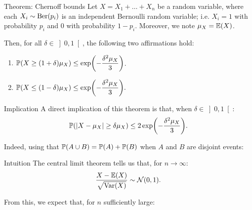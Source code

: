 \documentclass[a4paper]{article}
\begin{document}
\begin{parag}{Theorem: Chernoff bounds}
    Let $X = X_1 + \ldots + X_n$ be a random variable, where each $X_i \followsdistr \text{Ber}\left(p_i\right)$ is an independent Bernoulli random variable; i.e. $X_i = 1$ with probability $p_i$ and $0$ with probability $1 - p_i$. Moreover, we note $\mu_X = \exval\left(X\right)$.

    Then, for all $\delta \in \left]0, 1\right[ $, the following two affirmations hold:
    \begin{enumerate}
        \item $\displaystyle \prob\left(X \geq \left(1 + \delta\right)\mu_X\right) \leq \exp\left(-\frac{\delta^2 \mu_X}{3}\right)$.
        \item $\displaystyle \prob\left(X \leq \left(1 - \delta\right)\mu_X\right) \leq \exp\left(-\frac{\delta^2 \mu_X}{3}\right).$
    \end{enumerate}

    \begin{subparag}{Implication}
        A direct implication of this theorem is that, when $\delta \in \left]0, 1\right[ $: 
        \[\prob\left(\left|X - \mu_X\right| \geq \delta \mu_X\right) \leq 2 \exp\left(-\frac{\delta^2 \mu_X}{3}\right).\]
        
        Indeed, using that $\prob\left(A \cup B\right) = \prob\left(A\right)+ \prob\left(B\right)$ when $A$ and $B$ are disjoint events:
    \end{subparag}
    
    \begin{subparag}{Intuition}
        The central limit theorem tells us that, for $n \to \infty$: 
        \[\frac{X - \exval\left(X\right)}{\sqrt{\Var\left(X\right)}} \followsdistr \mathcal{N}\left(0, 1\right).\]

        From this, we expect that, for $n$ sufficiently large: 
        

\end{subparag}
\end{parag}
\end{document}
